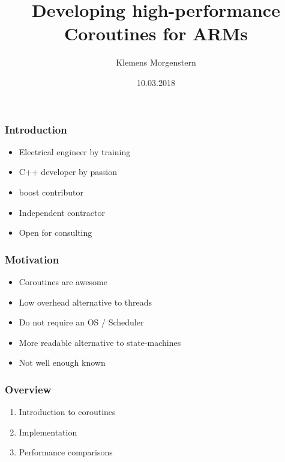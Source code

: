 \documentclass{beamer}
\begin{document}


\title{Developing high-performance Coroutines for ARMs}
\author{Klemens Morgenstern}
\date{10.03.2018}

\frame{\titlepage}

\begin{frame}
\frametitle{Introduction}
\begin{itemize}
\item Electrical engineer by training
\item C++ developer by passion
\item boost contributor
\item Independent contractor
\item Open for consulting
\end{itemize}
\end{frame}

\begin{frame}
\frametitle{Motivation}
\begin{itemize}
\item<1-> Coroutines are awesome
\item<2-> Low overhead alternative to threads 
\item<3-> Do not require an OS / Scheduler
\item<4-> More readable alternative to state-machines
\item<5-> Not well enough known 
\end{itemize}
\end{frame}


\begin{frame}
\frametitle{Overview}
\begin{enumerate}
\item<1-> Introduction to coroutines
\item<2-> Implementation
\item<3-> Performance comparisons
\end{enumerate}
\end{frame}
\end{document}
